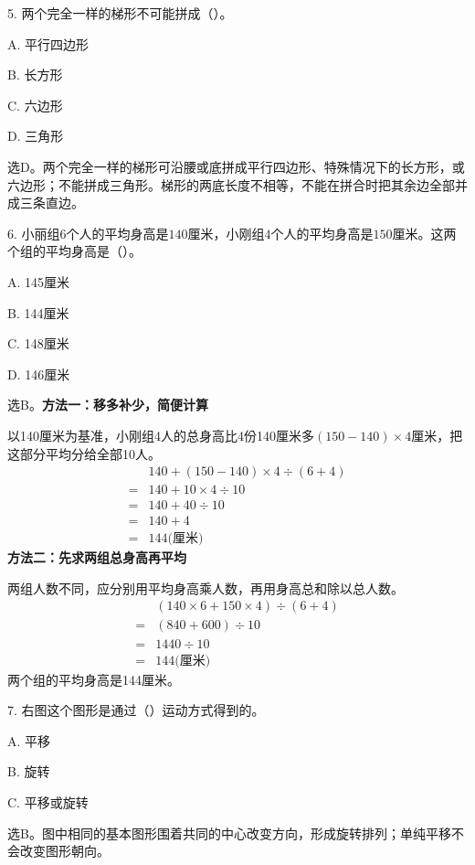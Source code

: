 5. 两个完全一样的梯形不可能拼成（\hspace{1.8em}）。\par
\noindent A. 平行四边形\par
\noindent B. 长方形\par
\noindent C. 六边形\par
\noindent D. 三角形\par
\begin{BookAnswer}
选D。两个完全一样的梯形可沿腰或底拼成平行四边形、特殊情况下的长方形，或六边形；不能拼成三角形。梯形的两底长度不相等，不能在拼合时把其余边全部并成三条直边。
\end{BookAnswer}

6. 小丽组\(6\)个人的平均身高是\(140\)厘米，小刚组\(4\)个人的平均身高是\(150\)厘米。这两个组的平均身高是（\hspace{1.8em}）。\par
\noindent A. 145厘米\par
\noindent B. 144厘米\par
\noindent C. 148厘米\par
\noindent D. 146厘米\par
\begin{BookAnswer}
选B。\textbf{方法一：移多补少，简便计算}\par 以140厘米为基准，小刚组4人的总身高比4份140厘米多\((150-140)\times4\)厘米，把这部分平均分给全部10人。\[\begin{aligned}&140+(150-140)\times4\div(6+4)\\={}&140+10\times4\div10\\={}&140+40\div10\\={}&140+4\\={}&144\text{(厘米)}\end{aligned}\]\textbf{方法二：先求两组总身高再平均}\par 两组人数不同，应分别用平均身高乘人数，再用身高总和除以总人数。\[\begin{aligned}&(140\times6+150\times4)\div(6+4)\\={}&(840+600)\div10\\={}&1440\div10\\={}&144\text{(厘米)}\end{aligned}\]两个组的平均身高是144厘米。
\end{BookAnswer}

7. 右图这个图形是通过（\hspace{1.8em}）运动方式得到的。\par
\noindent A. 平移\par
\noindent B. 旋转\par
\noindent C. 平移或旋转\par
{}
\begin{BookAnswer}
选B。图中相同的基本图形围着共同的中心改变方向，形成旋转排列；单纯平移不会改变图形朝向。
\end{BookAnswer}

